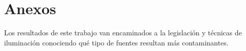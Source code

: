 \chapter{Anexos}

Los resultados de este trabajo van encaminados a la legislación y técnicas de iluminación conociendo qué tipo de fuentes resultan más contaminantes. 